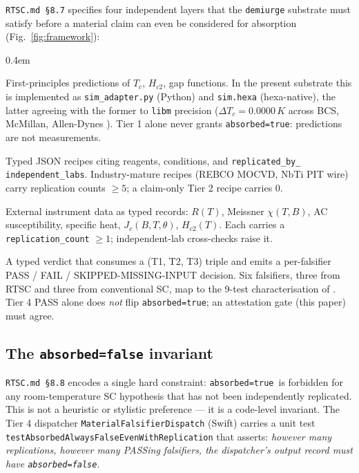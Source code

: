 \documentclass[11pt,a4paper]{article}
\newcommand{\absorbedtrue}{\textcolor{honestgreen}{\texttt{absorbed=true}}}
\newcommand{\absorbedfalse}{\textcolor{honestred}{\texttt{absorbed=false}}}
\begin{document}
\texttt{RTSC.md \S 8.7} specifies four independent layers that the
\texttt{demiurge} substrate must satisfy before a material claim can
even be considered for absorption (Fig.~\ref{fig:framework}):

\begin{description}\itemsep0.4em
\item[\textbf{Tier 1 -- Computational synthesis.}] First-principles
  predictions of \(T_{c}\), \(H_{c2}\), gap functions. In the present
  substrate this is implemented as \texttt{sim\_adapter.py} (Python)
  and \texttt{sim.hexa} (hexa-native), the latter agreeing with the
  former to \texttt{libm} precision (\(\Delta T_c = 0.0000\,K\)
  across BCS, McMillan, Allen-Dynes \cite{allen1975}).
  Tier 1 alone never grants \absorbedtrue: predictions are not
  measurements.
\item[\textbf{Tier 2 -- Synthesis-recipe-as-record.}] Typed JSON
  recipes citing reagents, conditions, and \texttt{replicated\_by\_
  independent\_labs}. Industry-mature recipes (REBCO MOCVD, NbTi
  PIT wire) carry replication counts \(\ge 5\); a claim-only Tier 2
  recipe carries 0.
\item[\textbf{Tier 3 -- Measurement ingest.}] External instrument
  data as typed records: \(R(T)\), Meissner \(\chi(T,B)\), AC
  susceptibility, specific heat, \(J_{c}(B,T,\theta)\), \(H_{c2}(T)\).
  Each carries a \texttt{replication\_count} \(\ge 1\); independent-lab
  cross-checks raise it.
\item[\textbf{Tier 4 -- Falsifier dispatch.}] A typed verdict that
  consumes a (T1, T2, T3) triple and emits a per-falsifier PASS / FAIL /
  SKIPPED-MISSING-INPUT decision. Six falsifiers, three from RTSC and
  three from conventional SC, map to the 9-test characterisation of
  \cite{wm2003htsmodel}. Tier 4 PASS alone does \emph{not} flip
  \absorbedtrue; an attestation gate (this paper) must agree.
\end{description}

\subsection{The \texttt{absorbed=false} invariant}
\label{sec:invariant}

\texttt{RTSC.md \S 8.8} encodes a single hard constraint:
\absorbedtrue\ is forbidden for any room-temperature SC hypothesis
that has not been independently replicated. This is not a heuristic
or stylistic preference --- it is a code-level invariant. The Tier 4
dispatcher \texttt{MaterialFalsifierDispatch} (Swift) carries a unit
test \texttt{testAbsorbedAlwaysFalseEvenWithReplication} that asserts:
\emph{however many replications, however many PASSing falsifiers, the
dispatcher's output record must have \absorbedfalse}.
\end{document}

